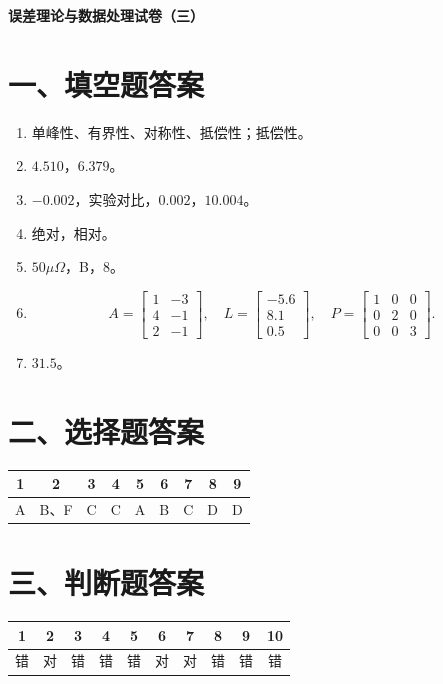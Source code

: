 \documentclass[UTF8,12pt,a4paper]{ctexart}
\begin{document}
\begin{center}
    {\bfseries 误差理论与数据处理试卷（三）}\par
    \vspace{0.8em}
\end{center}
\vspace{0.6em}

\section*{一、填空题答案}
\begin{enumerate}[label=\arabic*、]
\item 单峰性、有界性、对称性、抵偿性；抵偿性。
\item $4.510$，$6.379$。
\item $-0.002$，实验对比，$0.002$，$10.004$。
\item 绝对，相对。
\item $50\mu\Omega$，B，$8$。
\item 
\begin{equation*}
A=\begin{bmatrix}1&-3\\4&-1\\2&-1\end{bmatrix},\quad
L=\begin{bmatrix}-5.6\\8.1\\0.5\end{bmatrix},\quad
P=\begin{bmatrix}1&0&0\\0&2&0\\0&0&3\end{bmatrix}.
\end{equation*}
\item $31.5$。
\end{enumerate}

\section*{二、选择题答案}
\begin{center}
\begin{tabular}{ccccccccc}
\toprule
1&2&3&4&5&6&7&8&9\\
\midrule
A&B、F&C&C&A&B&C&D&D\\
\bottomrule
\end{tabular}
\end{center}

\section*{三、判断题答案}
\begin{center}
\begin{tabular}{cccccccccc}
\toprule
1&2&3&4&5&6&7&8&9&10\\
\midrule
错&对&错&错&错&对&对&错&错&错\\
\bottomrule
\end{tabular}
\end{center}
\end{document}

